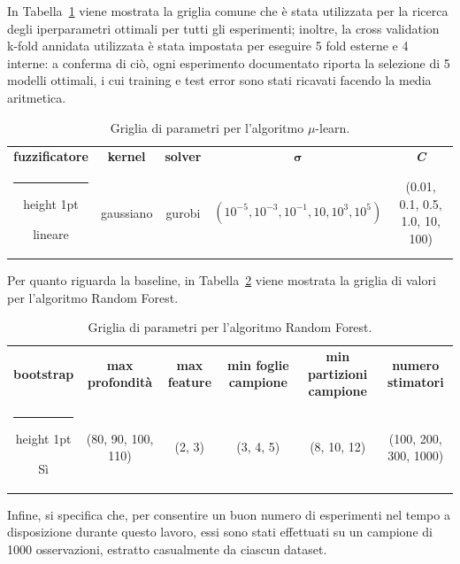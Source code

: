 \documentclass[12pt]{report}
\makeatletter
\theoremstyle{definition}
\newcommand{\thickhline}{%
    \noalign {\ifnum 0=`}\fi \hrule height 1pt
    \futurelet \reserved@a \@xhline
}
\makeatother
\begin{document}
In Tabella~\ref{gridtable} viene mostrata la griglia comune che è stata utilizzata per la ricerca degli iperparametri ottimali per tutti gli esperimenti; inoltre, la cross validation k-fold annidata utilizzata è stata impostata per eseguire 5 fold esterne e 4 interne: a conferma di ciò, ogni esperimento documentato riporta la selezione di 5 modelli ottimali, i cui training e test error sono stati ricavati facendo la media aritmetica.
\begin{table}
\centering
\begin{adjustbox}{max width=\textwidth}
 \begin{tabular}{|c|c|c|c|c|} 
 \hline
\textbf{fuzzificatore} & \textbf{kernel} & \textbf{solver} & $\bm{\sigma}$ & \textit{\textbf{C}} 
\\ [0.5ex] 
 \thickhline
 lineare & gaussiano & gurobi & $(10^{-5}, 10^{-3}, 10^{-1}, 10, 10^3, 10^5)$ & (0.01, 0.1, 0.5, 1.0, 10, 100) \\ 
 \hline
\end{tabular}
\end{adjustbox}
\caption{Griglia di parametri per l'algoritmo $\mu$-learn.}
\label{gridtable}
\end{table}
Per quanto riguarda la baseline, in Tabella~\ref{gridtablebaseline} viene mostrata la griglia di valori per l'algoritmo Random Forest.
\begin{table}
\centering
\begin{adjustbox}{max width=\textwidth}
 \begin{tabular}{|c|c|c|c|c|c|} 
 \hline
\textbf{bootstrap} & \textbf{max profondità} & \textbf{max feature} & \textbf{min foglie campione} & \textbf{min partizioni campione} & \textbf{numero stimatori}
\\ [0.5ex] 
 \thickhline
 Sì & (80, 90, 100, 110) & (2, 3) & (3, 4, 5) & (8, 10, 12) & (100, 200, 300, 1000) \\ 
 \hline
\end{tabular}
\end{adjustbox}
\caption{Griglia di parametri per l'algoritmo Random Forest.}
\label{gridtablebaseline}
\end{table}
Infine, si specifica che, per consentire un buon numero di esperimenti nel tempo a disposizione durante questo lavoro, essi sono stati effettuati su un campione di 1000 osservazioni, estratto casualmente da ciascun dataset.
\end{document}
